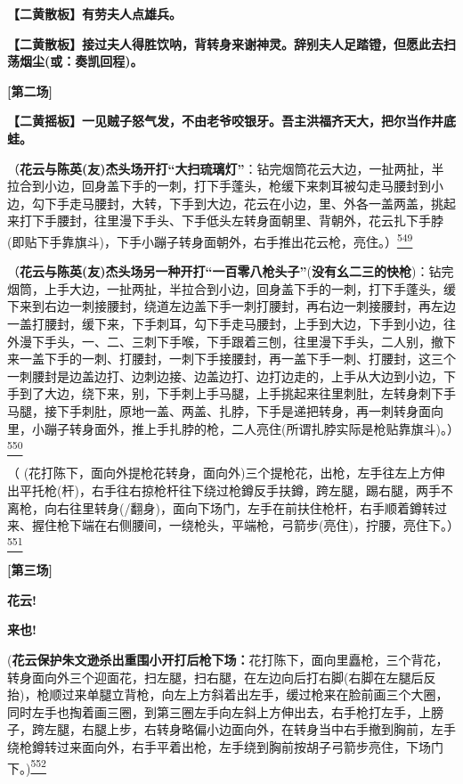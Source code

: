 \textbf{【二黄散板】有劳夫人点雄兵。}

\textbf{【二黄散板】接过夫人得胜饮呐，背转身来谢神灵。辞别夫人足踏镫，但愿此去扫荡烟尘(或：奏凯回程)。}

\textbf{{[}第二场{]}}

\textbf{【二黄摇板】一见贼子怒气发，不由老爷咬银牙。吾主洪福齐天大，把尔当作井底蛙。}

（\textbf{花云与陈英(友)杰头场开打``大扫琉璃灯''}：钻完烟筒花云大边，一扯两扯，半拉合到小边，回身盖下手的一刺，打下手蓬头，枪缓下来刺耳被勾走马腰封到小边，勾下手走马腰封，大转，下手到大边，花云在小边，里、外各一盖两盖，挑起来打下手腰封，往里漫下手头、下手低头左转身面朝里、背朝外，花云扎下手脖(即贴下手靠旗斗)，下手小蹦子转身面朝外，右手推出花云枪，亮住。）\protect\hyperlink{fn549}{\textsuperscript{549}}

（\textbf{花云与陈英(友)杰头场另一种开打``一百零八枪头子''}(\textbf{没有幺二三的快枪})：钻完烟筒，上手大边，一扯两扯，半拉合到小边，回身盖下手的一刺，打下手蓬头，缓下来到右边一刺接腰封，绕道左边盖下手一刺打腰封，再右边一刺接腰封，再左边一盖打腰封，缓下来，下手刺耳，勾下手走马腰封，上手到大边，下手到小边，往外漫下手头，一、二、三刺下手喉，下手跟着三刨，往里漫下手头，二人别，撤下来一盖下手的一刺、打腰封，一刺下手接腰封，再一盖下手一刺、打腰封，这三个一刺腰封是边盖边打、边刺边接、边盖边打、边打边走的，上手从大边到小边，下手到了大边，绕下来，别，下手刺上手马腿，上手挑起来往里刺肚，左转身刺下手马腿，接下手刺肚，原地一盖、两盖、扎脖，下手是递把转身，再一刺转身面向里，小蹦子转身面外，推上手扎脖的枪，二人亮住(所谓扎脖实际是枪贴靠旗斗)。）\protect\hyperlink{fn550}{\textsuperscript{550}}

（
(花打陈下，面向外提枪花转身，面向外)三个提枪花，出枪，左手往左上方伸出平托枪(杆)，右手往右掠枪杆往下绕过枪鐏反手扶鐏，跨左腿，踢右腿，两手不离枪，向右往里转身(/翻身)，面向下场门，左手在前扶住枪杆，右手顺着鐏转过来、握住枪下端在右侧腰间，一绕枪头，平端枪，弓箭步(亮住)，拧腰，亮住下。）\protect\hyperlink{fn551}{\textsuperscript{551}}

\textbf{{[}第三场{]}}

\textbf{花云!}

\textbf{来也!}

(\textbf{花云保护朱文逊杀出重围小开打后枪下场：}花打陈下，面向里矗枪，三个背花，转身面向外三个迎面花，扫左腿，扫右腿，在左边向后打右脚(右脚在左腿后反抬)，枪顺过来单腿立背枪，向左上方斜着出左手，缓过枪来在脸前画三个大圈，同时左手也掏着画三圈，到第三圈左手向左斜上方伸出去，右手枪打左手，上膀子，跨左腿，右腿上步，右转身略偏小边面向外，在转身当中右手撤到胸前，左手绕枪鐏转过来面向外，右手平着出枪，左手绕到胸前按胡子弓箭步亮住，下场门下。)\protect\hyperlink{fn552}{\textsuperscript{552}}

